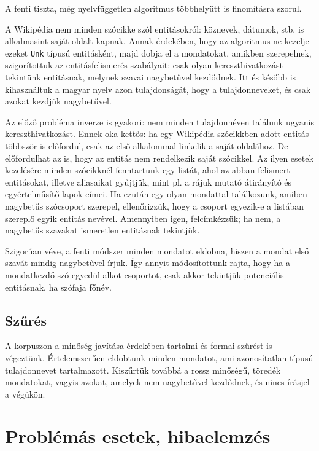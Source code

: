 \documentclass{llncs}
\begin{document}
A fenti tiszta, még nyelvfüggetlen algoritmus többhelyütt is finomításra szorul.

A Wikipédia nem minden szócikke szól entitásokról: köznevek, dátumok, stb. is
alkalmasint saját oldalt kapnak. Annak érdekében, hogy az algoritmus ne
kezelje ezeket \texttt{Unk} típusú entitásként, majd dobja el a mondatokat,
amikben szerepelnek, szigorítottuk az entitásfelismerés szabályait: csak olyan
kereszthivatkozást tekintünk entitásnak, melynek szavai nagybetűvel kezdődnek.
Itt és később is kihasználtuk a magyar nyelv azon tulajdonságát, hogy a
tulajdonneveket, és csak azokat kezdjük nagybetűvel.

Az előző probléma inverze is gyakori: nem minden tulajdonnéven találunk ugyanis
kereszthivatkozást. Ennek oka kettős: ha egy Wikipédia szócikkben adott entitás
többször is előfordul, csak az első alkalommal linkelik a saját oldalához. De
előfordulhat az is, hogy az entitás nem rendelkezik saját szócikkel. Az ilyen
esetek kezelésére minden szócikknél fenntartunk egy listát, ahol az abban
felismert entitásokat, illetve aliasaikat gyűjtjük, mint pl. a rájuk mutató
átirányító és egyértelműsítő lapok címei. Ha ezután egy olyan mondattal
találkozunk, amiben nagybetűs szócsoport szerepel, ellenőrizzük, hogy a csoport
egyezik-e a listában szereplő egyik entitás nevével. Amennyiben igen,
felcímkézzük; ha nem, a nagybetűs szavakat ismeretlen entitásnak tekintjük.

Szigorúan véve, a fenti módszer minden mondatot eldobna, hiszen a mondat első
szavát mindig nagybetűvel írjuk. Így annyit módosítottunk rajta, hogy ha a
mondatkezdő szó egyedül alkot csoportot, csak akkor tekintjük potenciális
entitásnak, ha szófaja főnév.

\subsection{Szűrés}

A korpuszon a minőség javítása érdekében tartalmi és formai szűrést is
végeztünk. Értelemszerűen eldobtunk minden mondatot, ami azonosítatlan típusú
tulajdonnevet tartalmazott. Kiszűrtük továbbá a rossz minőségű, töredék
mondatokat, vagyis azokat, amelyek nem nagybetűvel kezdődnek, és nincs írásjel
a végükön.

\section{Problémás esetek, hibaelemzés}
\label{probl}
\end{document}
